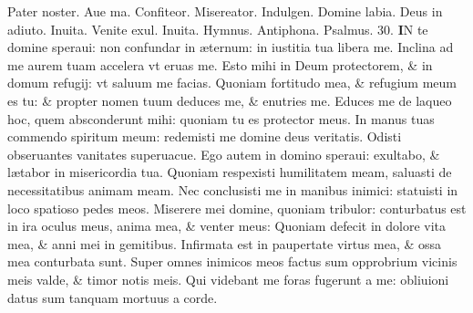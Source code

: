 \documentclass[a5paper,10pt]{book}
\def\ae{æ}
\begin{document}
\begin{multicols*}{2}
\vspace{-1em}
\par \noindent \color{red} P\color{black}ater noster. Aue ma. Confiteor. Misereator. Indulgen. Domine labia. Deus in adiuto. \color{red} Inuita. \color{black} Venite exul. \color{red} Inuita. Hymnus. Antiphona. \quad Psalmus. 30. \color{black}
\lettrine[lines=2]{\bfseries \color{red} I}{}N te domine speraui: non confundar in \ae ternum: in iustitia tua libera me.
\newline \color{red} I\color{black}nclina ad me aurem tuam accelera vt eruas me.
\newline \color{red} E\color{black}sto mihi in Deum protectorem, \& in domum refugij: vt saluum me facias.
\newline \color{red} Q\color{black}uoniam fortitudo mea, \& refugium meum es tu: \& propter nomen tuum deduces me, \& enutries me.
\newline \color{red} E\color{black}duces me de laqueo hoc, quem absconderunt mihi: quoniam tu es protector meus.
\newline \color{red} I\color{black}n manus tuas commendo spiritum meum: redemisti me domine deus veritatis.
\newline \color{red} O\color{black}disti obseruantes vanitates superuacue.
\newline \color{red} E\color{black}go autem in domino speraui: exultabo, \& l\ae tabor in misericordia tua.
\newline \color{red} Q\color{black}uoniam respexisti humilitatem meam, saluasti de necessitatibus animam meam.
\newline \color{red} N\color{black}ec conclusisti me in manibus inimici: statuisti in loco spatioso pedes meos.
\newline \color{red} M\color{black}iserere mei domine, quoniam tribulor: conturbatus est in ira oculus meus, anima mea, \& venter meus:
\newline \color{red} Q\color{black}uoniam defecit in dolore vita mea, \& anni mei in gemitibus.
\newline \color{red} I\color{black}nfirmata est in paupertate virtus mea, \& ossa mea conturbata sunt.
\newline \color{red} S\color{black}uper omnes inimicos meos factus sum opprobrium vicinis meis valde, \& timor notis meis.
\newline \color{red} Q\color{black}ui videbant me foras fugerunt a me: obliuioni datus sum tanquam mortuus a corde.

\end{multicols*}
\end{document}
